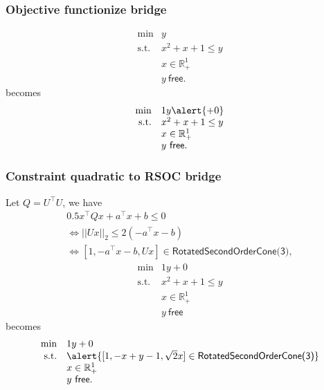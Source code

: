 \documentclass{beamer}
\begin{document}
\begin{frame}
  \frametitle{Objective functionize bridge}
\begin{equation*}
    \begin{array}{rl}
        \min & y\\
        \text{s.t.} & x^2 + x + 1 \le y\\
        & x \in \mathbb{R}^1_+\\
        & y\ \mathsf{free}.
    \end{array}
\end{equation*}
becomes
\begin{equation*}
    \begin{array}{rl}
        \min & 1y \alert{+ 0}\\
        \text{s.t.} & x^2 + x + 1 \le y\\
        & x \in \mathbb{R}^1_+\\
        & y\ \mathsf{free}.
    \end{array}
\end{equation*}
\end{frame}

\begin{frame}
  \frametitle{Constraint quadratic to RSOC bridge}
Let $Q = U^\top U$, we have
\begin{equation*}
    \begin{array}{l}
    0.5x^\top Q x + a^\top x + b \le 0 \\
    \iff || Ux ||_2 \le 2(-a^\top x - b)\\
    \iff [1, -a^\top x - b, Ux] \in \textsf{RotatedSecondOrderCone(3)},
    \end{array}
\end{equation*}
\begin{equation*}
    \begin{array}{rl}
        \min & 1y + 0\\
        \text{s.t.} & x^2 + x + 1 \le y\\
        & x \in \mathbb{R}^1_+\\
        & y\ \mathsf{free}
    \end{array}
\end{equation*}
becomes
\begin{equation*}
    \begin{array}{rl}
        \min & 1y + 0\\
        \text{s.t.} & \alert{[1, -x + y - 1, \sqrt 2x] \in \textsf{RotatedSecondOrderCone(3)}}\\
        & x \in \mathbb{R}^1_+\\
        & y\ \mathsf{free}.
    \end{array}
\end{equation*}
\end{frame}
\end{document}

